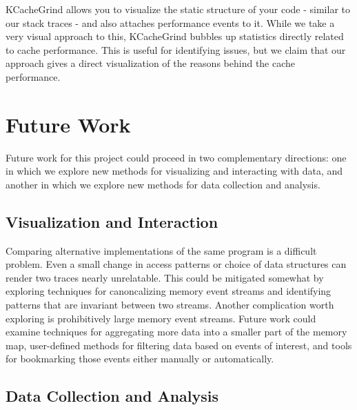 \documentclass[annual]{acmsiggraph}
\begin{document}
KCacheGrind allows you to visualize the static structure of your code - similar to our stack traces - and also attaches performance events to it. While we take a very visual approach to this, KCacheGrind bubbles up statistics directly related to cache performance. This is useful for identifying issues, but we claim that our approach gives a direct visualization of the reasons behind the cache performance.

\section{Future Work}\label{ch_f}

  Future work for this project could proceed in two complementary directions:
    one in which we explore new methods for visualizing and interacting with data,
    and another in which we explore new methods for data collection and analysis.

  \subsection{Visualization and Interaction}

  Comparing alternative implementations of the same program is a difficult problem.
  Even a small change in access patterns or choice of data structures can render two traces nearly unrelatable.
  This could be mitigated somewhat by exploring techniques for canoncalizing memory event streams and identifying patterns
    that are invariant between two streams.
  Another complication worth exploring is prohibitively large memory event streams.  
  Future work could examine techniques for aggregating more data into a smaller part of the memory map,
    user-defined methods for filtering data based on events of interest,
    and tools for bookmarking those events either manually or automatically.

  \subsection{Data Collection and Analysis}
\end{document}
